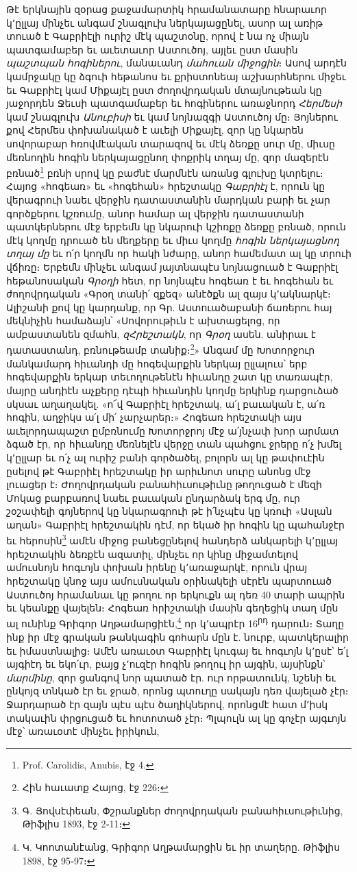 \documentclass{article}
\begin{document}
{Թէ երկնային զօրաց քաջամարտիկ հրամանատարը հնարաւոր կ՚ըլլայ մինչեւ անգամ շնագլուխ ներկայացընել, ասոր ալ առիթ տուած է Գաբրիէլի ուրիշ մէկ պաշտօնը, որով է նա ոչ միայն պատգամաբեր եւ աւետաւոր Աստուծոյ, այլեւ ըստ մասին \emph{պաշտպան հոգիներու}, մանաւանդ \emph{մահուան միջոցին}։ Ասով արդէն կամրջակը կը ձգուի հեթանոս եւ քրիստոնեայ աշխարհներու միջեւ եւ Գաբրիէլ կամ Միքայէլ ըստ ժողովրդական մտայնութեան կը յաջորդեն Ջեւսի պատգամաբեր եւ հոգիներու առաջնորդ \emph{Հերմեսի} կամ շնագլուխ \emph{Անուբիսի} եւ կամ նոյնազգի Աստուծոյ մը։ Յոյներու քով Հերմես փոխանակած է աւելի Միքայէլ, զոր կը նկարեն սովորաբար հռովմէական տարազով եւ մէկ ձեռքը սուր մը, միւսը մեռնողին հոգին ներկայացընող փոքրիկ տղայ մը, զոր մազերէն բռնած\footnote{Prof. Carolidis, Anubis, էջ 4.} բռնի սրով կը բաժնէ մարմնէն առանց գլուխը կտրելու։ Հայոց «հոգեառ» եւ «հոգեհան» հրեշտակը \emph{Գաբրիէլ} է, որուն կը վերագրուի նաեւ վերջին դատաստանին մարդկան բարի եւ չար գործքերու կշռումը, անոր համար ալ վերջին դատաստանի պատկերներու մէջ երբեմն կը նկարուի կշիռքը ձեռքը բռնած, որուն մէկ կողմը դրուած են մեղքերը եւ միւս կողմը \emph{հոգին ներկայացնող տղայ մը} եւ ո՛ր կողմն որ հակի նժարը, անոր համեմատ ալ կը տրուի վճիռը։ Երբեմն մինչեւ անգամ յայտնապէս նոյնացուած է Գաբրիէլ հեթանոսական \emph{Գրօղի} հետ, որ նոյնպէս հոգեառ է եւ հոգեհան եւ ժողովրդական «Գրօղ տանի՛ զքեզ» անէծքն ալ զայս կ՚ակնարկէ։ Ալիշանի քով կը կարդանք, որ Գր. Աստուածաբանի ճառերու հայ մեկնիչին համաձայն՝ «Սովորութիւն է ախտացելոց, որ ամբաստանեն զմահն, \emph{զՀրեշտակն}, որ \emph{Գրօղ} ասեն. անիրաւ է դատաստանդ, բռնութեամբ տանիք։\footnote{Հին հաւատք Հայոց, էջ 226։}» Անգամ մը Խոտորջուր մանկամարդ հիւանդի մը հոգեվարքին ներկայ ըլլալուս՝ երբ հոգեվարքին երկար տեւողութենէն հիւանդը շատ կը տառապէր, մայրը անդիէն աչքերը դէպի հիւանդին կողմը երկինք դարցուձած սկսաւ աղաղակել. «ո՜վ Գաբրիէլ հրեշտակ, ա՛լ բաւական է, ա՛ռ հոգին, աղջիկս ա՛լ մի՛ չարչարեր։» Հոգեառ հրեշտակի այս աւելորդապաշտ ըմբռնումը Խոտորջրոյ մէջ ա՛յնչափ խոր արմատ ձգած էր, որ հիւանդը մեռնելէն վերջը տան պահցու ջրերը ո՛չ խմել կ՚ըլլար եւ ո՛չ ալ ուրիշ բանի գործածել, բոլորն ալ կը թափուէին ըսելով թէ Գաբրիէլ հրեշտակը իր արիւնոտ սուրը անոնց մէջ լուացեր է։ Ժողովրդական բանահիւսութիւնը թողուցած է մեզի Մոկաց բարբառով նաեւ բաւական ընդարձակ երգ մը, ուր շօշափելի գոյներով կը նկարագրուի թէ ի՛նչպէս կը կռուի «Ասլան աղան» Գաբրիէլ հրեշտակին դէմ, որ եկած իր հոգին կը պահանջէր եւ հերոսին\footnote{Գ. Յովսէփեան, Փշրանքներ ժողովրդական բանահիւսութիւնից, Թիֆլիս 1893, էջ 2֊11։} ամէն միջոց բանեցընելով հանդերձ անկարելի կ՚ըլլայ հրեշտակին ձեռքէն ազատիլ, մինչեւ որ կինը միջամտելով ամուսնոյն հոգւոյն փոխան իրենը կ՚առաջարկէ, որուն վրայ հրեշտակը կնոջ այս ամուսնական օրինակելի սէրէն պարտուած Աստուծոյ հրամանաւ կը թողու որ երկուքն ալ դեռ 40 տարի ապրին եւ կեանքը վայելեն։ Հոգեառ հրիշտակի մասին գեղեցիկ տաղ մըն ալ ունինք Գրիգոր Աղթամարցիէն,\footnote{Կ. Կոոտանէանց, Գրիգոր Աղթամարցին եւ իր տաղերը. Թիֆլիս 1898, էջ 95֊97։} որ կ՚ապրէր 16\textsuperscript{րդ} դարուն։ Տաղը ինք իր մէջ գրական թանկագին գոհարն մըն է. նուրբ, պատկերալիր եւ իմաստնալից։ Ամէն առաւօտ Գաբրիէլ կուգայ եւ հոգւոյն կ՚ըսէ՝ ե՛լ այգիէդ եւ եկո՛ւր, բայց չ՚ուզէր հոգին թողուլ իր այգին, այսինքն՝ \emph{մարմինը}, զոր ցանգով նոր պատած էր. ուր որթատունկ, նշենի եւ ընկոյզ տնկած էր եւ ջրած, որոնց պտուղը սակայն դեռ վայելած չէր։ Ջարդարած էր զայն պէս պէս ծաղիկներով, որոնցմէ հատ մ՚իսկ տակաւին փրցուցած եւ հոտոտած չէր։ Պլպուլն ալ կը գոչէր այգւոյն մէջ՝ առաւօտէ մինչեւ իրիկուն, }
\end{document}
